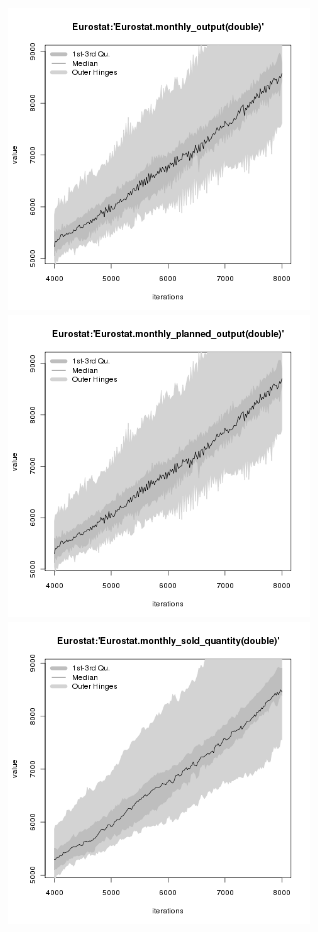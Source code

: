 \begin{figure}[H!]
\centering\leavevmode
\begin{minipage}{17cm}
\centering\leavevmode
\includegraphics[width=8cm]{./png/tax_0.05/Eurostat-monthly_output.png}
\includegraphics[width=8cm]{./png/tax_0.05/Eurostat-monthly_planned_output.png}\\
\includegraphics[width=8cm]{./png/tax_0.05/Eurostat-monthly_sold_quantity.png}

\end{minipage}
\end{figure}
